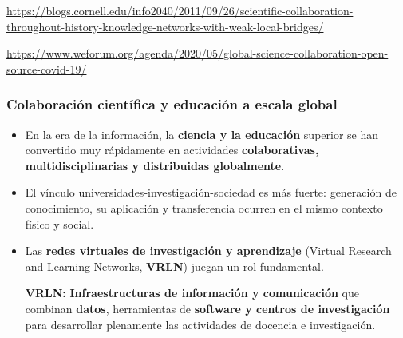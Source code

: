 \begin{frame}[fragile]
{\tiny \href{https://blogs.cornell.edu/info2040/2011/09/26/scientific-collaboration-throughout-history-knowledge-networks-with-weak-local-bridges/}{\color{cyan} https://blogs.cornell.edu/info2040/2011/09/26/scientific-collaboration-throughout-history-knowledge-networks-with-weak-local-bridges/}}

{\tiny \href{https://www.weforum.org/agenda/2020/05/global-science-collaboration-open-source-covid-19/}{\color{cyan} https://www.weforum.org/agenda/2020/05/global-science-collaboration-open-source-covid-19/}}

\end{frame}


\begin{frame}[fragile]
\frametitle{Colaboración científica y educación a escala global}
 
\begin{itemize}
\item En la era de la información, la {\bf \color{LCblueInst}ciencia y la educación} superior se han convertido muy rápidamente en actividades {\bf \color{LCredInst}colaborativas, multidisciplinarias y distribuidas globalmente}.

\item El vínculo universidades-investigación-sociedad es más fuerte: generación de conocimiento, su aplicación y transferencia ocurren en el mismo contexto físico y social. 

\item Las {\bf \color{logoyellow}redes virtuales de investigación y aprendizaje} (Virtual Research and Learning Networks, {\bf \color{logobrownD}VRLN}) juegan un rol fundamental.

\vspace{0.5cm}

{\bf VRLN:} {\bf \color{logobrownD}Infraestructuras de información y comunicación} que combinan {\bf \color{LCredInst}datos}, herramientas de {\bf \color{LCblueInst}software y centros de investigación} para desarrollar plenamente las actividades de docencia e investigación.
\end{itemize}

\end{frame}

